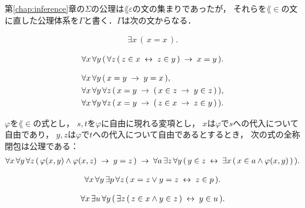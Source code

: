 	第\ref{chap:inference}章の$\Sigma$の公理は$\lang{\varepsilon}$の文の集まりであったが，
	それらを$\lang{\in}$の文に直した公理体系を$\Gamma$と書く．$\Gamma$は次の文からなる．
	\begin{description}
	\label{axioms_of_Gamma}
		\item[集合の存在]
			\begin{align}
				\exists x\, (\, x = x\, ).
			\end{align}
		
		\item[外延性]
			\begin{align}
				\forall x\, \forall y\, (\, \forall z\, 
				(\, z \in x \hspace{0.25em}\leftrightarrow\hspace{0.25em} z \in y\, ) \hspace{0.25em}\rightarrow\hspace{0.25em} x = y\, ).
			\end{align}
			
		\item[相等性] 
			\begin{align}
				&\forall x\, \forall y\, (\, x = y \hspace{0.25em}\rightarrow\hspace{0.25em} y = x\, ), \\
				&\forall x\, \forall y\, \forall z\, 
				(\, x = y \hspace{0.25em}\rightarrow\hspace{0.25em} (\, x \in z \hspace{0.25em}\rightarrow\hspace{0.25em} y \in z\, )\, ), \\
				&\forall x\, \forall y\, \forall z\, 
				(\, x = y \hspace{0.25em}\rightarrow\hspace{0.25em} (\, z \in x \hspace{0.25em}\rightarrow\hspace{0.25em} z \in y\, )\, ).
			\end{align}
		
		\item[置換] $\varphi$を$\lang{\in}$の式とし，
			$s,t$を$\varphi$に自由に現れる変項とし，
			$x$は$\varphi$で$s$への代入について自由であり，
			$y,z$は$\varphi$で$t$への代入について自由であるとするとき，
			次の式の全称閉包\footnotemark は公理である：
			\begin{align}
				\forall x\, \forall y\, \forall z\, 
				(\, \varphi(x,y) \wedge \varphi(x,z)
				\hspace{0.25em}\rightarrow\hspace{0.25em} y = z\, )
				\hspace{0.25em}\rightarrow\hspace{0.25em} \forall a\, \exists z\, \forall y\,
				(\, y \in z \hspace{0.25em}\leftrightarrow\hspace{0.25em} \exists x\, (\, x \in a \wedge 
				\varphi(x,y)\, )\, ).
			\end{align}
			
		\item[対] 
			\begin{align}
				\forall x\, \forall y\, \exists p\, \forall z\, 
				(\, x = z \vee y = z \hspace{0.25em}\leftrightarrow\hspace{0.25em} z \in p\, ).
			\end{align}
			
		\item[合併] 
			\begin{align}
				\forall x\, \exists u\, \forall y\, (\, \exists z\, (\, z \in x \wedge y \in z\, ) \hspace{0.25em}\leftrightarrow\hspace{0.25em} y \in u\, ).
			\end{align}
			

\end{description}
